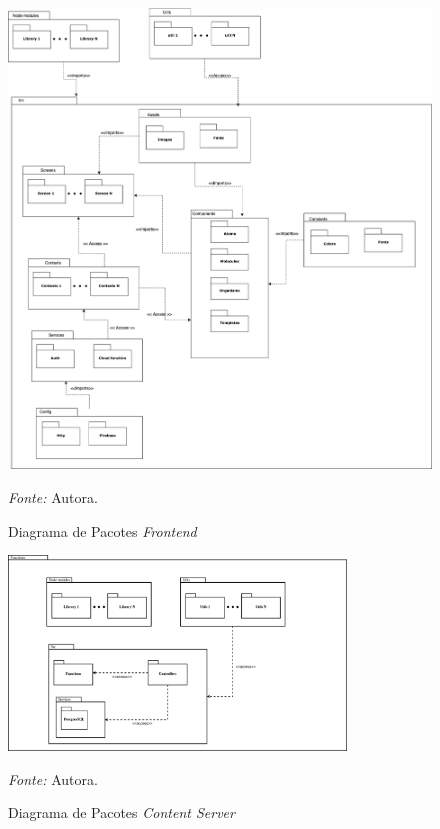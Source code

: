 \begin{figure}[h]
	\centering
	\caption{Diagrama de Pacotes \textit{Frontend}}
	\begin{adjustbox}{center}
		\includegraphics[width=1\textwidth]{figuras/frontend.eps}
	\end{adjustbox}
	\begin{tablenotes}[flushleft]
		\centering
		\item \textit{Fonte:} Autora.
	\end{tablenotes}
	\label{fig08}
\end{figure}

\pagebreak

\begin{figure}[h!]
	\centering
	\caption{Diagrama de Pacotes \textit{Content Server}}
	\begin{adjustbox}{center}
		\includegraphics[width=0.8\textwidth]{figuras/content.eps}
	\end{adjustbox}
	\begin{tablenotes}[flushleft]
		\centering
		\item \textit{Fonte:} Autora.
	\end{tablenotes}
	\label{fig09}
\end{figure}

